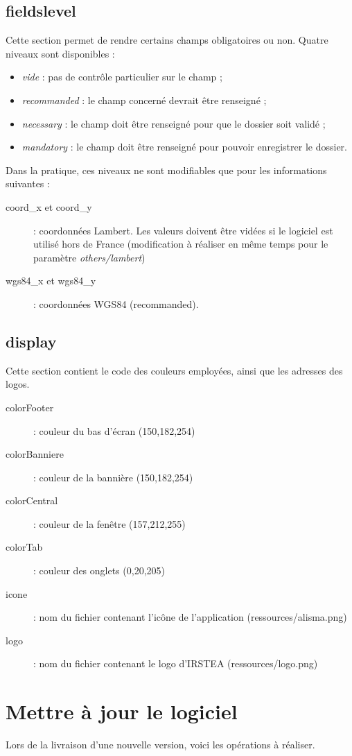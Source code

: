 \subsection{fieldslevel}
Cette section permet de rendre certains champs obligatoires ou non. Quatre niveaux sont disponibles :
\begin{itemize}
\item \textit{vide} : pas de contrôle particulier sur le champ ;
\item \textit{recommanded} : le champ concerné devrait être renseigné ;
\item \textit{necessary} : le champ doit être renseigné pour que le dossier soit validé ;
\item \textit{mandatory} : le champ doit être renseigné pour pouvoir enregistrer le dossier.
\end{itemize}

Dans la pratique, ces niveaux ne sont modifiables que pour les informations suivantes :
\begin{description}
\item [coord\_x et coord\_y] : coordonnées Lambert. Les valeurs doivent être vidées si le logiciel est utilisé hors de France (modification à réaliser en même temps pour le paramètre \textit{others/lambert}) 
\item [wgs84\_x et wgs84\_y] : coordonnées WGS84 (recommanded).
\end{description}

\subsection{display}
Cette section contient le code des couleurs employées, ainsi que les adresses des logos.
\begin{description}
\item [colorFooter] : couleur du bas d'écran (150,182,254)
\item [colorBanniere] : couleur de la bannière (150,182,254)
\item [colorCentral] : couleur de la fenêtre (157,212,255)
\item [colorTab] : couleur des onglets (0,20,205)
\item [icone] : nom du fichier contenant l'icône de l'application (ressources/alisma.png)
\item [logo] : nom du fichier contenant le logo d'IRSTEA (ressources/logo.png)
\end{description}

\section{Mettre à jour le logiciel}
\label{maj}
Lors de la livraison d'une nouvelle version, voici les opérations à réaliser.

